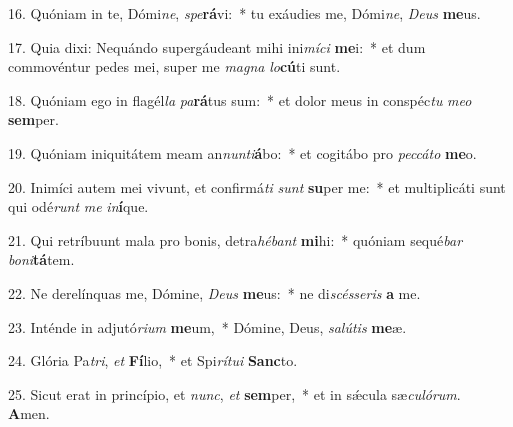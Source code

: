 16. Quóniam in te, Dómi\textit{ne}, \textit{spe}\textbf{rá}vi:~*  tu exáudies me, Dómi\textit{ne}, \textit{De}\textit{us} \textbf{me}us.\

17. Quia dixi: Nequándo supergáudeant mihi ini\textit{mí}\textit{ci} \textbf{me}i:~*  et dum commovéntur pedes mei, super me \textit{ma}\textit{gna} \textit{lo}\textbf{cú}ti sunt.\

18. Quóniam ego in flagél\textit{la} \textit{pa}\textbf{rá}tus sum:~*  et dolor meus in conspéc\textit{tu} \textit{me}\textit{o} \textbf{sem}per.\

19. Quóniam iniquitátem meam an\textit{nun}\textit{ti}\textbf{á}bo:~*  et cogitábo pro \textit{pec}\textit{cá}\textit{to} \textbf{me}o.\

20. Inimíci autem mei vivunt, et confirmá\textit{ti} \textit{sunt} \textbf{su}per me:~*  et multiplicáti sunt qui odé\textit{runt} \textit{me} \textit{in}\textbf{í}que.\

21. Qui retríbuunt mala pro bonis, detra\textit{hé}\textit{bant} \textbf{mi}hi:~*  quóniam sequé\textit{bar} \textit{bo}\textit{ni}\textbf{tá}tem.\

22. Ne derelínquas me, Dómine, \textit{De}\textit{us} \textbf{me}us:~*  ne di\textit{scés}\textit{se}\textit{ris} \textbf{a} me.\

23. Inténde in adjutó\textit{ri}\textit{um} \textbf{me}um,~*  Dómine, Deus, \textit{sa}\textit{lú}\textit{tis} \textbf{me}æ.\

24. Glória Pa\textit{tri}, \textit{et} \textbf{Fí}lio,~*  et Spi\textit{rí}\textit{tu}\textit{i} \textbf{Sanc}to.\

25. Sicut erat in princípio, et \textit{nunc}, \textit{et} \textbf{sem}per,~*  et in sǽcula sæ\textit{cu}\textit{ló}\textit{rum}. \textbf{A}men.\


